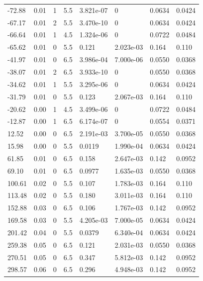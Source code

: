\documentclass[preview]{standalone}
\begin{document}
{{\begin{tabular}{L{1.2cm}C{1.2cm} C{0.3cm}C{0.5cm} C{1.4cm}C{1.4cm} C{1.4cm}C{1.4cm}}
  -72.88  &  0.01  & 1     & 5.5 &  3.821e-07  & 0  & 0.0634 &  0.0424   \\ 
  -67.17  &  0.01  & 2     & 5.5 &  3.470e-10  & 0  & 0.0634 &  0.0424   \\ 
  -66.64  &  0.01  & 1     & 4.5 &  1.324e-06  & 0  & 0.0722 &  0.0484   \\ 
  -65.62  &  0.01  & 0     & 5.5 &  0.121  & 2.023e-03  & 0.164 &  0.110   \\ 
  -41.97  &  0.01  & 0     & 6.5 &  3.986e-04  & 7.000e-06  & 0.0550 &  0.0368   \\ 
  -38.07  &  0.01  & 2     & 6.5 &  3.933e-10  & 0  & 0.0550 &  0.0368   \\ 
  -34.62  &  0.01  & 1     & 5.5 &  3.295e-06  & 0  & 0.0634 &  0.0424   \\ 
  -31.79  &  0.01  & 0     & 5.5 &  0.123  & 2.067e-03  & 0.164 &  0.110   \\ 
  -20.62  &  0.00  & 1     & 4.5 &  3.499e-06  & 0  & 0.0722 &  0.0484   \\ 
  -12.87  &  0.00  & 1     & 6.5 &  6.174e-07  & 0  & 0.0554 &  0.0371   \\ 
  12.52  &  0.00  & 0     & 6.5 &  2.191e-03  & 3.700e-05  & 0.0550 &  0.0368   \\ 
  15.98  &  0.00  & 0     & 5.5 &  0.0119  & 1.990e-04  & 0.0634 &  0.0424   \\ 
  61.85  &  0.01  & 0     & 6.5 &  0.158  & 2.647e-03  & 0.142 &  0.0952   \\ 
  69.10  &  0.01  & 0     & 6.5 &  0.0977  & 1.635e-03  & 0.0550 &  0.0368   \\ 
  100.61  &  0.02  & 0     & 5.5 &  0.107  & 1.783e-03  & 0.164 &  0.110   \\ 
  113.48  &  0.02  & 0     & 5.5 &  0.180  & 3.011e-03  & 0.164 &  0.110   \\ 
  152.88  &  0.03  & 0     & 6.5 &  0.106  & 1.767e-03  & 0.142 &  0.0952   \\ 
  169.58  &  0.03  & 0     & 5.5 &  4.205e-03  & 7.000e-05  & 0.0634 &  0.0424   \\ 
  201.42  &  0.04  & 0     & 5.5 &  0.0379  & 6.340e-04  & 0.0634 &  0.0424   \\ 
  259.38  &  0.05  & 0     & 6.5 &  0.121  & 2.031e-03  & 0.0550 &  0.0368   \\ 
  270.51  &  0.05  & 0     & 6.5 &  0.347  & 5.812e-03  & 0.142 &  0.0952   \\ 
  298.57  &  0.06  & 0     & 6.5 &  0.296  & 4.948e-03  & 0.142 &  0.0952   \\ 

\end{tabular}}}
\end{document}

